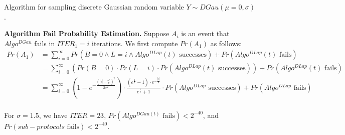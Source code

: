 \begin{algorithm}[tbh!]
    \centering
    \caption{Algorithm for sampling discrete Gaussian random variable $Y\sim DGau \left(\mu=0,\sigma\right)$.}
    \label{algo:DiscreteGauss}
\end{algorithm}
\FloatBarrier

\textbf{Algorithm Fail Probability Estimation. }
Suppose $A_i$ is an event that $Algo^{DGau}$ fails in $ITER_1=i$ iterations.
We first compute $Pr\left(A_1\right) $ as follows:
\begin{equation}
    \begin{split}
        Pr\left(A_1\right) &=\sum_{i = 0}^{\infty}  Pr\left( B= 0 \land L=i \land Algo^{DLap}\left(t\right)  \text{ successes}\right) + Pr\left(Algo^{DLap}\left(t\right)  \text{ fails}\right) \\
        &= \sum_{i = 0}^{\infty}  \left(Pr\left( B= 0 \right) \cdot Pr\left( L=i \right)\cdot Pr\left(  Algo^{DLap}\left(t\right)  \text{ successes}\right)\right) + Pr\left(Algo^{DLap}\left(t\right)  \text{ fails}\right) \\
        &=\sum_{i = 0}^{\infty} \left(1-e^{-\frac{\left(\left\lvert i\right\rvert-\frac{\sigma^2}{t}\right)^2  }{2\sigma^2}}\right)  \cdot \frac{\left(e^{\frac{1}{t}}-1\right) \cdot  e^{-\frac{\left\lvert i\right\rvert }{d}}}{e^{\frac{1}{t}}+1} \cdot Pr\left(Algo^{DLap} \text{ successes}\right)  + Pr\left(Algo^{DLap} \text{ fails}\right) \\
    \end{split}
\end{equation}

For $\sigma =1.5$, we have $ITER=23$, $Pr\left( Algo^{DGau\left(t\right) } \text{ fails} \right) <2^{-40}$, and $Pr\left( sub-protocols  \text{ fails} \right) <2^{-40}$.


